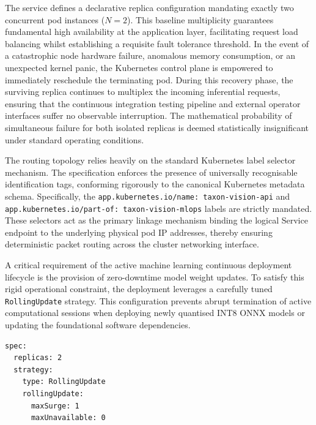 The service defines a declarative replica configuration mandating exactly two concurrent pod instances ($N = 2$). This baseline multiplicity guarantees fundamental high availability at the application layer, facilitating request load balancing whilst establishing a requisite fault tolerance threshold. In the event of a catastrophic node hardware failure, anomalous memory consumption, or an unexpected kernel panic, the Kubernetes control plane is empowered to immediately reschedule the terminating pod. During this recovery phase, the surviving replica continues to multiplex the incoming inferential requests, ensuring that the continuous integration testing pipeline and external operator interfaces suffer no observable interruption. The mathematical probability of simultaneous failure for both isolated replicas is deemed statistically insignificant under standard operating conditions.

The routing topology relies heavily on the standard Kubernetes label selector mechanism. The specification enforces the presence of universally recognisable identification tags, conforming rigorously to the canonical Kubernetes metadata schema. Specifically, the \texttt{app.kubernetes.io/name: taxon-vision-api} and \texttt{app.kubernetes.io/part-of: taxon-vision-mlops} labels are strictly mandated. These selectors act as the primary linkage mechanism binding the logical Service endpoint to the underlying physical pod IP addresses, thereby ensuring deterministic packet routing across the cluster networking interface.

A critical requirement of the active machine learning continuous deployment lifecycle is the provision of zero-downtime model weight updates. To satisfy this rigid operational constraint, the deployment leverages a carefully tuned \texttt{RollingUpdate} strategy. This configuration prevents abrupt termination of active computational sessions when deploying newly quantised INT8 ONNX models or updating the foundational software dependencies.

\begin{listing}[htbp]
\begin{verbatim}
spec:
  replicas: 2
  strategy:
    type: RollingUpdate
    rollingUpdate:
      maxSurge: 1
      maxUnavailable: 0
\end{verbatim}
\caption{Deployment update strategy extracting absolute zero-downtime guarantees.}
\label{lst:rolling_update}
\end{listing}

